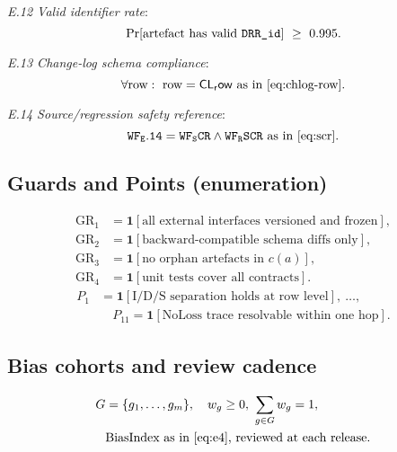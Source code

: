 \documentclass[conference]{IEEEtran}
\begin{document}
\noindent\emph{E.12 Valid identifier rate}:
\begin{equation}
\label{eq:e12}
\Pr\!\left[\text{artefact has valid }\text{\texttt{DRR\_id}}\right]\ \ge\ 0.995.
\end{equation}

\noindent\emph{E.13 Change-log schema compliance}:
\begin{equation}
\label{eq:e13}
\forall \text{row}:\ \text{row}=\mathsf{CL_row}\ \text{as in \eqref{eq:chlog-row}}.
\end{equation}

\noindent\emph{E.14 Source/regression safety reference}:
\begin{equation}
\label{eq:e14}
\mathtt{WF_E.14}=\mathtt{WF_SCR}\wedge \mathtt{WF_RSCR}\ \text{as in \eqref{eq:scr}}.
\end{equation}

\subsection{Guards and Points (enumeration)}
\begin{align}
\label{eq:gr-1}
\mathrm{GR}_{1} &= \mathbf{1}\!\left[\text{all external interfaces versioned and frozen}\right],\\
\label{eq:gr-2}
\mathrm{GR}_{2} &= \mathbf{1}\!\left[\text{backward-compatible schema diffs only}\right],\\
\label{eq:gr-3}
\mathrm{GR}_{3} &= \mathbf{1}\!\left[\text{no orphan artefacts in }c(a)\right],\\
\label{eq:gr-4}
\mathrm{GR}_{4} &= \mathbf{1}\!\left[\text{unit tests cover all contracts}\right].
\end{align}
\begin{equation}\label{eq:p-1}
\begin{aligned}
P_{1}&=\mathbf{1}\!\left[\text{I/D/S separation holds at row level}\right],\ \ldots,\\
&\quad P_{11}=\mathbf{1}\!\left[\text{NoLoss trace resolvable within one hop}\right].
\end{aligned}
\end{equation}

\subsection{Bias cohorts and review cadence}
\begin{equation}\label{eq:bias-cohorts}
\begin{aligned}
G&=\{g_1,\ldots,g_m\},\quad w_g\ge 0,\ \sum_{g\in G} w_g=1,\\
&\text{BiasIndex as in \eqref{eq:e4}, reviewed at each release}.
\end{aligned}
\end{equation}
\end{document}
